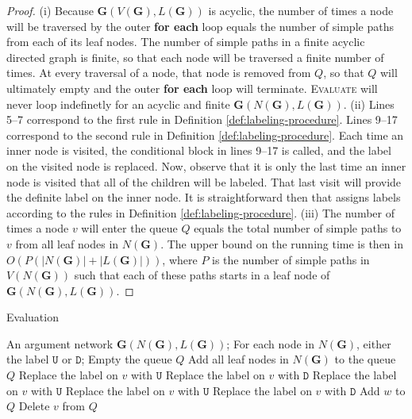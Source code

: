 \documentclass[10pt, conference, compsocconf]{IEEEtran}
\begin{document}
\begin{proof}
(i) Because $\textbf{G}(V(\textbf{G}), L(\textbf{G}))$ is acyclic, the number of times a node will be traversed by the outer \textbf{for each} loop equals the number of simple paths from each of its leaf nodes. The number of simple paths in a finite acyclic directed graph is finite, so that each node will be traversed a finite number of times. At every traversal of a node, that node is removed from $Q$, so that $Q$ will ultimately empty and the outer \textbf{for each} loop will terminate. \textsc{Evaluate} will never loop indefinetly for an acyclic and finite $\textbf{G}(N(\textbf{G}), L(\textbf{G}))$. (ii) Lines 5--7 correspond to the first rule in Definition \ref{def:labeling-procedure}. Lines 9--17 correspond to the second rule in Definition \ref{def:labeling-procedure}. Each time an inner node is visited, the conditional block in lines 9--17 is called, and the label on the visited node is replaced. Now, observe that it is only the last time an inner node is visited that all of the children will be labeled. That last visit will provide the definite label on the inner node. It is straightforward then that assigns labels according to the rules in Definition \ref{def:labeling-procedure}. (iii) The number of times a node $v$ will enter the queue $Q$ equals the total number of simple paths to $v$ from all leaf nodes in $N(\textbf{G})$. The upper bound on the running time is then in $O(P(|N(\textbf{G})| + |L(\textbf{G})|))$, where $P$ is the number of simple paths in $V(N(\textbf{G}))$ such that each of these paths starts in a leaf node of $\textbf{G}(N(\textbf{G}), L(\textbf{G}))$.
\end{proof}

\begin{algorithm}[t]
\caption{Evaluation}\label{algo:evaluate}
{\footnotesize{
	\renewcommand\algorithmicrequire{\textbf{Input:}}
	\renewcommand\algorithmicensure{\textbf{Output:}}
	\begin{algorithmic}[1]
		\Require An argument network $\textbf{G}(N(\textbf{G}), L(\textbf{G}))$;
		\Ensure For each node in $N(\textbf{G})$, either the label $\texttt{U}$ or $\texttt{D}$;
			\State Empty the queue $Q$
			\State Add all leaf nodes in $N(\textbf{G})$ to the queue $Q$
					\State Replace the label on $v$ with $\texttt{U}$
				\Else
							\State Replace the label on $v$ with $\texttt{D}$
							\State Replace the label on $v$ with $\texttt{U}$
							\State Replace the label on $v$ with $\texttt{U}$
							\State Replace the label on $v$ with $\texttt{D}$
						\EndIf
						\State Add $w$ to $Q$
					\EndFor
				\EndIf
				\State Delete $v$ from $Q$
			\EndFor
		\EndProcedure
	\end{algorithmic}
}}
\end{algorithm}
\end{document}
